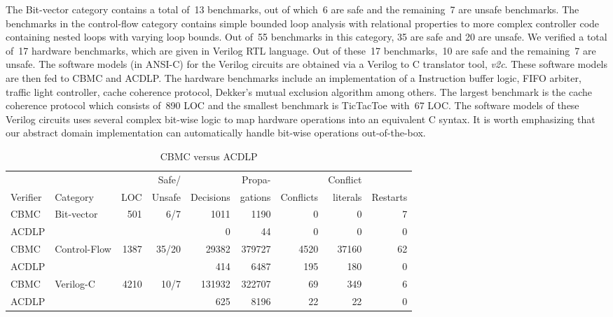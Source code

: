 The Bit-vector category contains a total of~13 benchmarks, out of which~6 
are safe and the remaining~7 are unsafe benchmarks.  The benchmarks in the control-flow
category contains simple bounded loop analysis with relational properties 
to more complex controller code containing nested loops with varying loop bounds.  
Out of~55 benchmarks in this category, 35 are safe and 20 are
unsafe.  We verified a total of~17 hardware benchmarks, which are given in
Verilog RTL language.  Out of these~17 benchmarks,~10 are safe and the 
remaining~7 are unsafe.  The software models (in ANSI-C) for the Verilog 
circuits are obtained via a Verilog to C translator tool, {\em v2c}.  These 
software models are then fed to CBMC and ACDLP.  The hardware benchmarks 
include an implementation of a Instruction buffer logic, FIFO arbiter, traffic light
controller, cache coherence protocol, Dekker's mutual exclusion algorithm
among others.  The largest benchmark is the cache coherence protocol which
consists of~890 LOC and the smallest benchmark is TicTacToe with~67 LOC. 
The software models of these Verilog circuits uses several complex bit-wise
logic to map hardware operations into an equivalent C syntax.  It is worth
emphasizing that our abstract domain implementation can automatically handle
bit-wise operations out-of-the-box.
%
\begin{table}[!b]
\begin{center}
{
\begin{tabular}{l|l|r|r|r|r|r|r|r}
\hline
           &          &     & Safe/  &           & Propa-  &           & Conflict &          \\
  Verifier & Category & LOC & Unsafe & Decisions & gations & Conflicts & literals & Restarts \\ \hline
  CBMC & \multirow{2}{*}{Bit-vector} & \multirow{2}{*}{501} &
  \multirow{2}{*}{6/7} & 1011 & 1190 & 0 & 0 & 7 \\
  ACDLP & & & & 0 & 44 & 0 & 0 & 0 \\ \hline
  CBMC & \multirow{2}{*}{Control-Flow} & \multirow{2}{*}{1387} & 
  \multirow{2}{*}{35/20} & 29382 & 379727 & 4520 & 37160 & 62 \\ 
  ACDLP & & & & 414 & 6487 & 195 & 180 & 0  \\ \hline
  CBMC & \multirow{2}{*}{Verilog-C} & \multirow{2}{*}{4210} & 
  \multirow{2}{*}{10/7} & 131932 & 322707 & 69 & 349 & 6 \\ 
  ACDLP & & & & 625 & 8196 & 22 & 22 & 0 \\ \hline
\end{tabular}
}
\end{center}
\caption{CBMC versus ACDLP}
\label{detailed_result}
\end{table}
%


